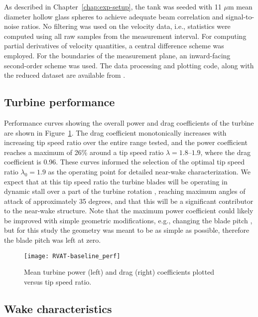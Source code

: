 As described in Chapter~\ref{chap:exp-setup}, the tank was seeded with 11 $\mu$m
mean diameter hollow glass spheres to achieve adequate beam correlation and
signal-to-noise ratios. No filtering was used on the velocity data, i.e.,
statistics were computed using all raw samples from the measurement interval.
For computing partial derivatives of velocity quantities, a central difference
scheme was employed. For the boundaries of the measurement plane, an
inward-facing second-order scheme was used. The data processing and plotting
code, along with the reduced dataset are available from
\cite{Bachant2014-RVAT-baseline}.


\subsection{Turbine performance}

Performance curves showing the overall power and drag coefficients of the
turbine are shown in Figure~\ref{fig:RVAT-baseline-perf}. The drag coefficient
monotonically increases with increasing tip speed ratio over the entire range
tested, and the power coefficient reaches a maximum of 26\% around a tip speed
ratio $\lambda=1.8$--$1.9$, where the drag coefficient is 0.96. These curves
informed the selection of the optimal tip speed ratio $\lambda_0 = 1.9$ as the
operating point for detailed near-wake characterization. We expect that at this
tip speed ratio the turbine blades will be operating in dynamic stall over a
part of the turbine rotation \cite{Scheurich2011}, reaching maximum angles of
attack of approximately 35 degrees, and that this will be a significant
contributor to the near-wake structure. Note that the maximum power coefficient
could likely be improved with simple geometric modifications, e.g., changing the
blade pitch \cite{Fiedler2009}, but for this study the geometry was meant to be
as simple as possible, therefore the blade pitch was left at zero.

\begin{figure}
    \centering
    \texttt{[image: RVAT-baseline\_perf]}
    \caption{Mean turbine power (left) and drag (right) coefficients plotted
        versus tip speed ratio.}
    \label{fig:RVAT-baseline-perf}
\end{figure}




\subsection{Wake characteristics}

